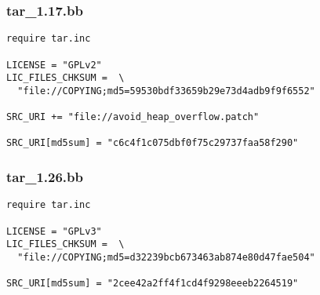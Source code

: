 \begin{frame}[fragile]
  \frametitle{tar\_1.17.bb}
  \begin{block}{}
    \begin{verbatim}
require tar.inc

LICENSE = "GPLv2"
LIC_FILES_CHKSUM =  \
  "file://COPYING;md5=59530bdf33659b29e73d4adb9f9f6552"

SRC_URI += "file://avoid_heap_overflow.patch"

SRC_URI[md5sum] = "c6c4f1c075dbf0f75c29737faa58f290"
    \end{verbatim}
  \end{block}
\end{frame}

\begin{frame}[fragile]
  \frametitle{tar\_1.26.bb}
  \begin{block}{}
    \begin{verbatim}
require tar.inc

LICENSE = "GPLv3"
LIC_FILES_CHKSUM =  \
  "file://COPYING;md5=d32239bcb673463ab874e80d47fae504"

SRC_URI[md5sum] = "2cee42a2ff4f1cd4f9298eeeb2264519"
    \end{verbatim}
  \end{block}
\end{frame}
